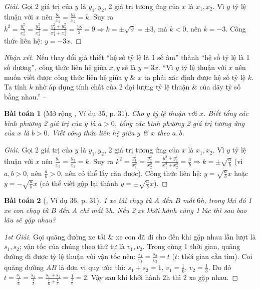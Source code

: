 \documentclass{article}
\numberwithin{equation}{section}
\newtheorem{baitoan}{Bài toán}
\begin{document}
\begin{proof}[Giải]
	Gọi 2 giá trị của $y$ là $y_1,y_2$, 2 giá trị tương ứng của $x$ là $x_1,x_2$. Vì $y$ tỷ lệ thuận với $x$ nên $\frac{y_1}{x_1} = \frac{y_2}{x_2} = k$. Suy ra $k^2 = \frac{y_1^2}{x_1^2} = \frac{y_2^2}{x_2^2} = \frac{y_1^2 + y_2^2}{x_1^2 + x_2^2} = \frac{18}{2} = 9\Rightarrow k = \pm\sqrt{9} = \pm3$, mà $k < 0$, nên $k = -3$. Công thức liên hệ: $y = -3x$. 
\end{proof}
\noindent\textit{Nhận xét.} Nếu thay đổi giả thiết ``hệ số tỷ lệ là 1 số âm'' thành ``hệ số tỷ lệ là 1 số dương'', công thức liên hệ giữa $x,y$ sẽ là $y = 3x$. ``Vì $y$ tỷ lệ thuận với $x$ nên muốn viết được công thức liên hệ giữa $y$ \& $x$ ta phải xác định được hệ số tỷ lệ $k$. Ta tính $k$ nhờ áp dụng tính chất của 2 đại lượng tỷ lệ thuận \& của dãy tỷ số bằng nhau.'' -- \cite[p. 31]{Tuyen_Toan_7}

\begin{baitoan}[Mở rộng \cite{Tuyen_Toan_7}, Ví dụ 35, p. 31]
	Cho $y$ tỷ lệ thuận với $x$. Biết tổng các bình phương 2 giá trị của $y$ là $a > 0$, tổng các bình phương 2 giá trị tương ứng của $x$ là $b > 0$. Viết công thức liên hệ giữa $y$ \& $x$ theo $a,b$.
\end{baitoan}

\begin{proof}[Giải]
	Gọi 2 giá trị của $y$ là $y_1,y_2$, 2 giá trị tương ứng của $x$ là $x_1,x_2$. Vì $y$ tỷ lệ thuận với $x$ nên $\frac{y_1}{x_1} = \frac{y_2}{x_2} = k$. Suy ra $k^2 = \frac{y_1^2}{x_1^2} = \frac{y_2^2}{x_2^2} = \frac{y_1^2 + y_2^2}{x_1^2 + x_2^2} = \frac{a}{b}\Rightarrow k = \pm\sqrt{\frac{a}{b}}$ (vì $a,b > 0$, nên $\frac{a}{b} > 0$, nên có thể lấy căn được). Công thức liên hệ: $y = \sqrt{\frac{a}{b}}x$ hoặc $y = -\sqrt{\frac{a}{b}}x$ (có thể viết gộp lại thành $y = \pm\sqrt{\frac{a}{b}}x$). 
\end{proof}

\begin{baitoan}[\cite{Tuyen_Toan_7}, Ví dụ 36, p. 31]
	1 xe tải chạy từ $A$ đến $B$ mất $6$\emph{h}, trong khi đó 1 xe con chạy từ $B$ đến $A$ chỉ mất $3$\emph{h}. Nếu 2 xe khởi hành cùng 1 lúc thì sau bao lâu sẽ gặp nhau?
\end{baitoan}

\begin{proof}[1st Giải]
	Gọi quãng đường xe tải \& xe con đã đi cho đến khi gặp nhau lần lượt là $s_1,s_2$; vận tốc của chúng theo thứ tự là $v_1,v_2$. Trong cùng 1 thời gian, quãng đường đi được tỷ lệ thuận với vận tốc nên: $\frac{s_1}{v_1} = \frac{s_2}{v_2} = t$ ($t$: thời gian cần tìm). Coi quãng đường $AB$ là đơn vị quy ước thì: $s_1 + s_2 = 1$, $v_1 = \frac{1}{6}$, $v_2 = \frac{1}{3}$. Do đó $t = \frac{s_1}{\frac{1}{6}} = \frac{s_2}{\frac{1}{3}} = \frac{s_1 + s_2}{\frac{1}{6} + \frac{1}{3}} = \frac{1}{\frac{3}{6}} = 2$. Vậy sau khi khởi hành $2$h thì 2 xe gặp nhau.
\end{proof}
\end{document}
